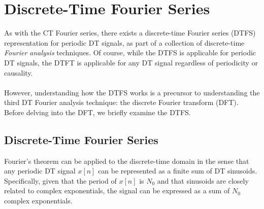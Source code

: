 \documentclass{report}
\begin{document}
\setcounter{chapter}{5}
\setcounter{page}{66}
\chapter{Discrete-Time Fourier Series}

As with the CT Fourier series, there exists a discrete-time Fourier series (DTFS) representation for periodic DT signals,  
as part of a collection of discrete-time \emph{Fourier analysis} techniques. Of course, while the DTFS is applicable for periodic DT signals, 
the DTFT is applicable for any DT signal regardless of periodicity or causality. 
\\ \\
However, understanding how the DTFS works is a precursor to understanding the third DT Fourier analysis technique: the discrete Fourier transform (DFT).
Before delving into the DFT, we briefly examine the DTFS.

\section{Discrete-Time Fourier Series}
Fourier's theorem can be applied to the discrete-time domain in the sense that any periodic DT signal $x[n]$ can be represented as a finite sum of DT sinusoids. 
Specifically, given that the period of $x[n]$ is $N_0$ and that sinusoids are closely related to complex exponentials, the signal can be expressed as a 
sum of $N_0$ complex exponentials.
\end{document}
